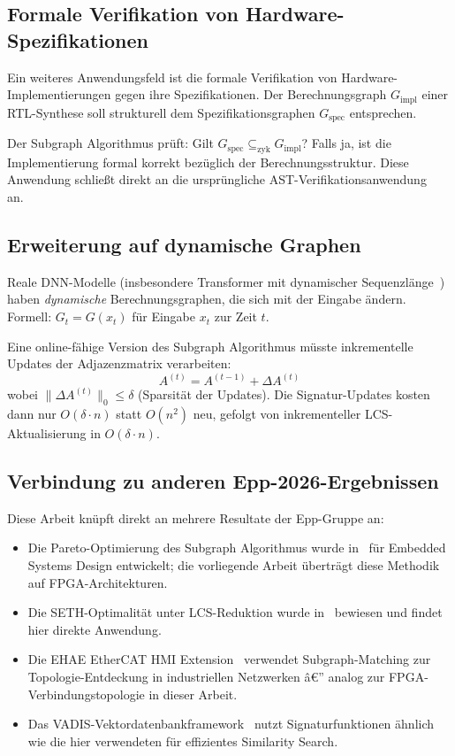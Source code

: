 ﻿\documentclass[a4paper,12pt]{article}
\theoremstyle{definition}
\begin{document}
\subsection{Formale Verifikation von Hardware-Spezifikationen}

Ein weiteres Anwendungsfeld ist die formale Verifikation von Hardware-Implementierungen
gegen ihre Spezifikationen. Der Berechnungsgraph $G_{\text{impl}}$ einer RTL-Synthese
soll strukturell dem Spezifikationsgraphen $G_{\text{spec}}$ entsprechen.

Der Subgraph Algorithmus prüft: Gilt $G_{\text{spec}} \subseteq_{\text{zyk}} G_{\text{impl}}$?
Falls ja, ist die Implementierung formal korrekt bezüglich der Berechnungsstruktur.
Diese Anwendung schließt direkt an die ursprüngliche AST-Verifikationsanwendung~\cite{epp2026a} an.

\subsection{Erweiterung auf dynamische Graphen}

Reale DNN-Modelle (insbesondere Transformer mit dynamischer Sequenzlänge~\cite{jentzsch2025})
haben \emph{dynamische} Berechnungsgraphen, die sich mit der Eingabe ändern.
Formell: $G_t = G(x_t)$ für Eingabe $x_t$ zur Zeit $t$.

Eine online-fähige Version des Subgraph Algorithmus müsste inkrementelle Updates
der Adjazenzmatrix verarbeiten:
\[
    A^{(t)} = A^{(t-1)} + \Delta A^{(t)}
\]
wobei $\|\Delta A^{(t)}\|_0 \leq \delta$ (Sparsität der Updates).
Die Signatur-Updates kosten dann nur $O(\delta \cdot n)$ statt $O(n^2)$ neu,
gefolgt von inkrementeller LCS-Aktualisierung in $O(\delta \cdot n)$.

\subsection{Verbindung zu anderen Epp-2026-Ergebnissen}

Diese Arbeit knüpft direkt an mehrere Resultate der Epp-Gruppe an:
\begin{itemize}
    \item Die Pareto-Optimierung des Subgraph Algorithmus wurde in~\cite{epp2026d}
          für Embedded Systems Design entwickelt; die vorliegende Arbeit überträgt
          diese Methodik auf FPGA-Architekturen.
    \item Die SETH-Optimalität unter LCS-Reduktion wurde in~\cite{epp2026b} bewiesen
          und findet hier direkte Anwendung.
    \item Die EHAE EtherCAT HMI Extension~\cite{epp2026e} verwendet Subgraph-Matching
          zur Topologie-Entdeckung in industriellen Netzwerken â€” analog zur
          FPGA-Verbindungstopologie in dieser Arbeit.
    \item Das VADIS-Vektordatenbankframework~\cite{epp2026f} nutzt Signaturfunktionen
          ähnlich wie die hier verwendeten für effizientes Similarity Search.
\end{itemize}
\end{document}

